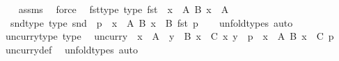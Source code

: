 \begin{isabellebody}
%
\isadelimproof
\ \ %
\endisadelimproof
%
\isatagproof
{}\isamarkupfalse%
\ assms\ \isamarkupfalse%
\ force%
\endisatagproof
{\isafoldproof}%
%
\isadelimproof
\isanewline
%
\endisadelimproof
\isanewline
{}\isamarkupfalse%
\isanewline
\ \ fst{\isacharunderscore}{\kern0pt}type\ {\isacharbrackleft}{\kern0pt}type{\isacharbrackright}{\kern0pt}{\isacharcolon}{\kern0pt}\ {\isachardoublequoteopen}fst\ {\isacharcolon}{\kern0pt}\ {\isacharparenleft}{\kern0pt}{\isasymSum}x\ {\isacharcolon}{\kern0pt}\ A{\isachardot}{\kern0pt}\ {\isacharparenleft}{\kern0pt}B\ x{\isacharparenright}{\kern0pt}{\isacharparenright}{\kern0pt}\ {\isasymRightarrow}\ A{\isachardoublequoteclose}\ \isanewline
\ \ snd{\isacharunderscore}{\kern0pt}type\ {\isacharbrackleft}{\kern0pt}type{\isacharbrackright}{\kern0pt}{\isacharcolon}{\kern0pt}\ {\isachardoublequoteopen}snd\ {\isacharcolon}{\kern0pt}\ {\isacharparenleft}{\kern0pt}p\ {\isacharcolon}{\kern0pt}\ {\isasymSum}x\ {\isacharcolon}{\kern0pt}\ A{\isachardot}{\kern0pt}\ {\isacharparenleft}{\kern0pt}B\ x{\isacharparenright}{\kern0pt}{\isacharparenright}{\kern0pt}\ {\isasymRightarrow}\ B\ {\isacharparenleft}{\kern0pt}fst\ p{\isacharparenright}{\kern0pt}{\isachardoublequoteclose}\isanewline
%
\isadelimproof
\ \ %
\endisadelimproof
%
\isatagproof
{}\isamarkupfalse%
\ unfold{\isacharunderscore}{\kern0pt}types\ auto%
\endisatagproof
{\isafoldproof}%
%
\isadelimproof
\isanewline
%
\endisadelimproof
\isanewline
{}\isamarkupfalse%
\ uncurry{\isacharunderscore}{\kern0pt}type\ {\isacharbrackleft}{\kern0pt}type{\isacharbrackright}{\kern0pt}{\isacharcolon}{\kern0pt}\isanewline
\ \ {\isachardoublequoteopen}uncurry\ {\isacharcolon}{\kern0pt}\ {\isacharparenleft}{\kern0pt}{\isacharparenleft}{\kern0pt}x\ {\isacharcolon}{\kern0pt}\ A{\isacharparenright}{\kern0pt}\ {\isasymRightarrow}\ {\isacharparenleft}{\kern0pt}y\ {\isacharcolon}{\kern0pt}\ B\ x{\isacharparenright}{\kern0pt}\ {\isasymRightarrow}\ C\ {\isasymlangle}x{\isacharcomma}{\kern0pt}\ y{\isasymrangle}{\isacharparenright}{\kern0pt}\ {\isasymRightarrow}\ {\isacharparenleft}{\kern0pt}p\ {\isacharcolon}{\kern0pt}\ {\isasymSum}x\ {\isacharcolon}{\kern0pt}\ A{\isachardot}{\kern0pt}\ {\isacharparenleft}{\kern0pt}B\ x{\isacharparenright}{\kern0pt}{\isacharparenright}{\kern0pt}\ {\isasymRightarrow}\ C\ p{\isachardoublequoteclose}\isanewline
%
\isadelimproof
\ \ %
\endisadelimproof
%
\isatagproof
{}\isamarkupfalse%
\ uncurry{\isacharunderscore}{\kern0pt}def\ \isamarkupfalse%
\ unfold{\isacharunderscore}{\kern0pt}types\ auto%

\end{isabellebody}
